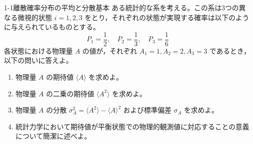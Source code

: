 
\begin{mondai}{1-1}{離散確率分布の平均と分散}{基本}
ある統計的な系を考える。この系は3つの異なる微視的状態 $i=1, 2, 3$ をとり，それぞれの状態が実現する確率は以下のように与えられているものとする。
\begin{equation*}
P_1 = \frac{1}{2}, \quad P_2 = \frac{1}{3}, \quad P_3 = \frac{1}{6}
\end{equation*}
各状態における物理量 $A$ の値が，それぞれ $A_1 = 1, A_2 = 2, A_3 = 3$ であるとき，以下の問いに答えよ。

\begin{enumerate}
  \item 物理量 $A$ の期待値 $\langle A \rangle$ を求めよ。

  \item 物理量 $A$ の二乗の期待値 $\langle A^2 \rangle$ を求めよ。

  \item 物理量 $A$ の分散 $\sigma_A^2 = \langle A^2 \rangle - \langle A \rangle^2$ および標準偏差 $\sigma_A$ を求めよ。

  \item 統計力学において期待値が平衡状態での物理的観測値に対応することの意義について簡潔に述べよ。
\end{enumerate}
\end{mondai}

